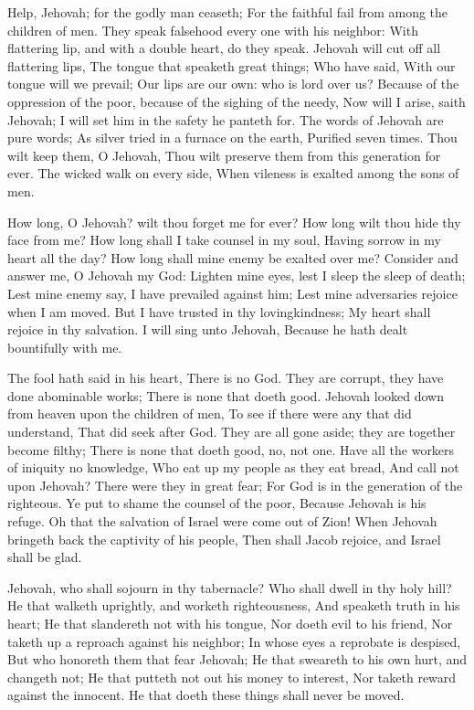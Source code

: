Help, Jehovah; for the godly man ceaseth; For the faithful fail from among the children of men.  They speak falsehood every one with his neighbor: With flattering lip, and with a double heart, do they speak.  Jehovah will cut off all flattering lips, The tongue that speaketh great things;  Who have said, With our tongue will we prevail; Our lips are our own: who is lord over us?  Because of the oppression of the poor, because of the sighing of the needy, Now will I arise, saith Jehovah; I will set him in the safety he panteth for.  The words of Jehovah are pure words; As silver tried in a furnace on the earth, Purified seven times.  Thou wilt keep them, O Jehovah, Thou wilt preserve them from this generation for ever.  The wicked walk on every side, When vileness is exalted among the sons of men. 

How long, O Jehovah? wilt thou forget me for ever? How long wilt thou hide thy face from me?  How long shall I take counsel in my soul, Having sorrow in my heart all the day? How long shall mine enemy be exalted over me?  Consider and answer me, O Jehovah my God: Lighten mine eyes, lest I sleep the sleep of death;  Lest mine enemy say, I have prevailed against him; Lest mine adversaries rejoice when I am moved.  But I have trusted in thy lovingkindness; My heart shall rejoice in thy salvation.  I will sing unto Jehovah, Because he hath dealt bountifully with me. 

The fool hath said in his heart, There is no God. They are corrupt, they have done abominable works; There is none that doeth good.  Jehovah looked down from heaven upon the children of men, To see if there were any that did understand, That did seek after God.  They are all gone aside; they are together become filthy; There is none that doeth good, no, not one.  Have all the workers of iniquity no knowledge, Who eat up my people as they eat bread, And call not upon Jehovah?  There were they in great fear; For God is in the generation of the righteous.  Ye put to shame the counsel of the poor, Because Jehovah is his refuge.  Oh that the salvation of Israel were come out of Zion! When Jehovah bringeth back the captivity of his people, Then shall Jacob rejoice, and Israel shall be glad. 

Jehovah, who shall sojourn in thy tabernacle? Who shall dwell in thy holy hill?  He that walketh uprightly, and worketh righteousness, And speaketh truth in his heart;  He that slandereth not with his tongue, Nor doeth evil to his friend, Nor taketh up a reproach against his neighbor;  In whose eyes a reprobate is despised, But who honoreth them that fear Jehovah; He that sweareth to his own hurt, and changeth not;  He that putteth not out his money to interest, Nor taketh reward against the innocent. He that doeth these things shall never be moved. 

